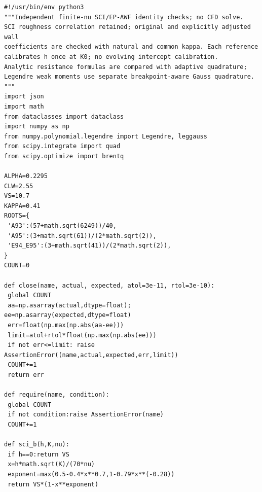 \documentclass[11pt,a4paper]{article}
\numberwithin{equation}{section}
\begin{document}
\begin{lstlisting}[caption={Standalone wall-equation and coefficient-consistency checks.}]
#!/usr/bin/env python3
"""Independent finite-nu SCI/EP-AWF identity checks; no CFD solve.
SCI roughness correlation retained; original and explicitly adjusted wall
coefficients are checked with natural and common kappa. Each reference
calibrates h once at K0; no evolving intercept calibration.
Analytic resistance formulas are compared with adaptive quadrature;
Legendre weak moments use separate breakpoint-aware Gauss quadrature.
"""
import json
import math
from dataclasses import dataclass
import numpy as np
from numpy.polynomial.legendre import Legendre, leggauss
from scipy.integrate import quad
from scipy.optimize import brentq

ALPHA=0.2295
CLW=2.55
VS=10.7
KAPPA=0.41
ROOTS={
 'A93':(57+math.sqrt(6249))/40,
 'A95':(3+math.sqrt(61))/(2*math.sqrt(2)),
 'E94_E95':(3+math.sqrt(41))/(2*math.sqrt(2)),
}
COUNT=0

def close(name, actual, expected, atol=3e-11, rtol=3e-10):
 global COUNT
 aa=np.asarray(actual,dtype=float); ee=np.asarray(expected,dtype=float)
 err=float(np.max(np.abs(aa-ee)))
 limit=atol+rtol*float(np.max(np.abs(ee)))
 if not err<=limit: raise AssertionError((name,actual,expected,err,limit))
 COUNT+=1
 return err

def require(name, condition):
 global COUNT
 if not condition:raise AssertionError(name)
 COUNT+=1

def sci_b(h,K,nu):
 if h==0:return VS
 x=h*math.sqrt(K)/(70*nu)
 exponent=max(0.5-0.4*x**0.7,1-0.79*x**(-0.28))
 return VS*(1-x**exponent)


\end{lstlisting}
\end{document}
